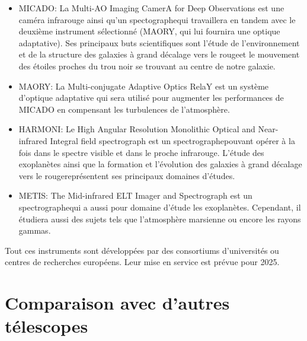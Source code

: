 \begin{itemize}
	
	\item MICADO: La Multi-AO Imaging CamerA for Deep Observations est une caméra infrarouge ainsi qu'un spectographe\footnotemark[1] qui travaillera en tandem avec le deuxième instrument sélectionné (MAORY, qui lui fournira une optique adaptative). Ses principaux buts scientifiques sont l'étude de l'environnement et de la structure des galaxies à grand décalage vers le rouge\footnotemark[2] et le mouvement des étoiles proches du trou noir se trouvant au centre de notre galaxie. 
	
	\item MAORY: La Multi-conjugate Adaptive Optics RelaY est un système d'optique adaptative qui sera utilisé pour augmenter les performances de MICADO en compensant les turbulences de l'atmosphère.
	
	\item HARMONI: Le High Angular Resolution Monolithic Optical and Near-infrared Integral field spectrograph est un spectrographe\footnotemark[1] pouvant opérer à la fois dans le spectre visible et dans le proche infrarouge. L'étude des exoplanètes ainsi que la formation et l'évolution des galaxies à grand décalage vers le rouge\footnotemark[2] représentent ses principaux domaines d'études.
	
	\item METIS: The Mid-infrared ELT Imager and Spectrograph est un spectrographe\footnotemark[1] qui a aussi pour domaine d'étude les exoplanètes. Cependant, il étudiera aussi des sujets tels que l'atmosphère marsienne ou encore les rayons gammas.
	
\end{itemize}

Tout ces instruments sont développées par des consortiums d'universités ou centres de recherches européens. Leur mise en service est prévue pour 2025.
	
\vfill
{}	

\newpage

\section{Comparaison avec d'autres télescopes}\label{4.3}

